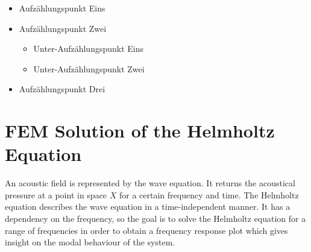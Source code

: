 \documentclass[%
  a4paper,oneside,%
  11pt,%
  smallchapters,
  green,%
  rgb, <cmyk>
  ,]{tubsbook}
\begin{document}
\lipsum[1]

\begin{itemize}
  \item Aufzählungspunkt Eins
  \item Aufzählungspunkt Zwei
    \begin{itemize}
      \item Unter-Aufzählungspunkt Eins
      \item Unter-Aufzählungspunkt Zwei
    \end{itemize}
  \item Aufzählungspunkt Drei
\end{itemize}



\chapter{FEM Solution of the Helmholtz Equation}
An acoustic field is represented by the wave equation. It returns the acoustical pressure at a point in space $X$ for a certain frequency and time.
The Helmholtz equation describes the wave equation in a time-independent manner. It has a dependency on the frequency, so the goal is to solve the Helmholtz equation for a range of frequencies in order to obtain a frequency response plot which gives insight on the modal behaviour of the system.
\end{document}
